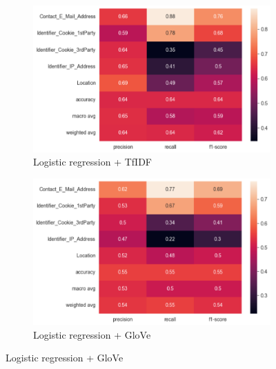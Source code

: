 \begin{figure}[!ht]
	\begin{subfigure}[t]{.5\textwidth}
	  \centering
	  \includegraphics[width=\linewidth]{figures/heatmap_log_tfidf.png}
	  \caption{Logistic regression + TfIDF}
	\end{subfigure}
	\hfill
	\begin{subfigure}[t]{.5\textwidth}
	  \centering
	  \includegraphics[width=\linewidth]{figures/heatmap_log_glove.png}
	  \caption{Logistic regression + GloVe}
	\end{subfigure}
	
	\medskip
  

\end{figure}
